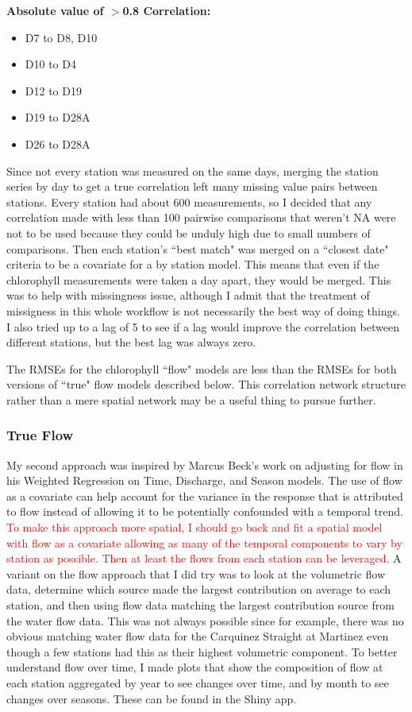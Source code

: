 \documentclass[12pt]{amsart}
\begin{document}
\textbf{Absolute value of $>$0.8 Correlation:}
\begin{itemize}
\item D7 to D8, D10
\item D10 to D4
\item D12 to D19
\item D19 to D28A
\item D26 to D28A
\end{itemize}

Since not every station was measured on the same days, merging the station series by day to get a true correlation left many missing value pairs between stations. Every station had about 600 measurements, so I decided that any correlation made with less than 100 pairwise comparisons that weren't NA were not to be used because they could be unduly high due to small numbers of comparisons. Then each station's ``best match" was merged on a ``closest date" criteria to be a covariate for a by station model. This means that even if the chlorophyll measurements were taken a day apart, they would be merged. This was to help with missingness issue, although I admit that the treatment of missigness in this whole workflow is not necessarily the best way of doing things. I also tried up to a lag of 5 to see if a lag would improve the correlation between different stations, but the best lag was always zero. 


The RMSEs for the chlorophyll ``flow" models are less than the RMSEs for both versions of ``true" flow models described below. This correlation network structure rather than a mere spatial network may be a useful thing to pursue further.

\subsubsection{True Flow}

My second approach was inspired by Marcus Beck's work on adjusting for flow in his Weighted Regression on Time, Discharge, and Season models. The use of flow as a covariate can help account for the variance in the response that is attributed to flow instead of allowing it to be potentially confounded with a temporal trend. \textcolor{red}{To make this approach more spatial, I should go back and fit a spatial model with flow as a covariate allowing as many of the temporal components to vary by station as possible. Then at least the flows from each station can be leveraged.} A variant on the flow approach that I did try was to look at the volumetric flow data, determine which source made the largest contribution on average to each station, and then using flow data matching the largest contribution source from the water flow data. This was not always possible since for example, there was no obvious matching water flow data for the Carquinez Straight at Martinez even though a few stations had this as their highest volumetric component. To better understand flow over time, I  made plots that show the composition of flow at each station aggregated by year to see changes over time, and by month to see changes over seasons. These can be found in the Shiny app.
\end{document}
